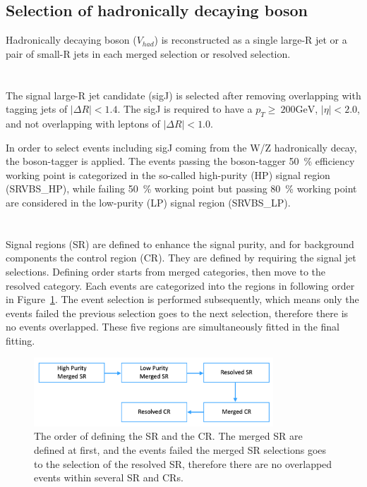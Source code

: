 \subsection{Selection of hadronically decaying boson}
Hadronically decaying boson ($V_{had}$) is reconstructed as a single large-R jet or a pair of small-R jets in each merged selection or resolved selection. \\ \\
\noindent\textbf{}  \\
The signal large-R jet candidate (sigJ) is selected after removing overlapping with tagging jets of $|\Delta R|<1.4$. The sigJ is required to have a $p_{T} \geq ~200 \mathrm{GeV}$, $|\eta| < 2.0$, and not overlapping with leptons of $|\Delta R|<1.0$.

In order to select events including sigJ coming from the W/Z hadronically decay, the boson-tagger is applied. The events passing the boson-tagger 50~\% efficiency working point is categorized in the so-called high-purity (HP) signal region (SRVBS\_HP), while failing 50~\% working point but passing 80~\% working point are considered in the low-purity (LP) signal region (SRVBS\_LP). \\ \\ 

\noindent\textbf{}  \\


Signal regions (SR) are defined to enhance the signal purity, and for background  components the control region (CR). They are defined by requiring the signal jet selections. Defining order starts from merged categories, then move to the resolved category. Each events are categorized into the regions in following order in Figure~\ref{fig:order}. The event selection is performed subsequently, which means only the events failed the previous selection goes to the next selection, therefore there is no events overlapped.
These five regions are simultaneously fitted in the final fitting.

\begin{figure}[H]
    \centering
    \includegraphics[width=0.8\textwidth]{figures/order}
    \caption{The order of defining the SR and the CR. The merged SR are defined at first, and the events failed the merged SR selections goes to the selection of the resolved SR, therefore there are no overlapped events within several SR and CRs.}
    \label{fig:order}
\end{figure}


